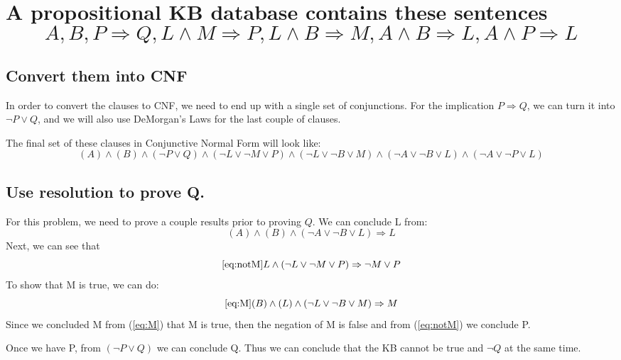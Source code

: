 \documentclass{article}
\begin{document}
\section{A propositional KB database contains these sentences
\[A,B,P\Rightarrow Q, L\land M\Rightarrow P, L\land B\Rightarrow M, A\land B\Rightarrow L, A\land P\Rightarrow L \]
}
	\subsection{Convert them into CNF}
	In order to convert the clauses to CNF, we need to end up with a single set of conjunctions. For 
	the implication $P\Rightarrow Q$, we can turn it into $\neg P \lor Q$, and we will also use 
	DeMorgan's Laws for the last couple of clauses.

	The final set of these clauses in Conjunctive Normal Form will look like:
	\begin{equation}
			(A)\land(B)\land(\neg P \lor Q)\land(\neg L \lor \neg M \lor P) \land(\neg L \lor \neg B \lor M)
			\land(\neg A \lor \neg B \lor L) \land(\neg A\lor \neg P \lor L)
	\end{equation}
	\subsection{Use resolution to prove Q.}
		For this problem, we need to prove a couple results prior to proving $Q$.
		We can conclude L from:
		\begin{equation}
			(A)\land(B)\land(\neg A \lor \neg B\lor L ) \Rightarrow L
		\end{equation}
		Next, we can see that
		\begin{equation}
			\ref{eq:notM}
			 L \land(\neg L \lor \neg M \lor P) \Rightarrow \neg M \lor P
		\end{equation}
		To show that M is true, we can do:
		\begin{equation}
			\ref{eq:M}
		 	(B) \land (L) \land(\neg L \lor \neg B \lor M)\Rightarrow M
		\end{equation}
		Since we concluded M from (\ref{eq:M}) that M is true, then the negation of M is false and from
		(\ref{eq:notM}) we conclude P.

		Once we have P, from $(\neg P \lor Q)$ we can conclude Q. Thus we can conclude that the KB cannot
		be true and $\neg Q$ at the same time.
\end{document}
